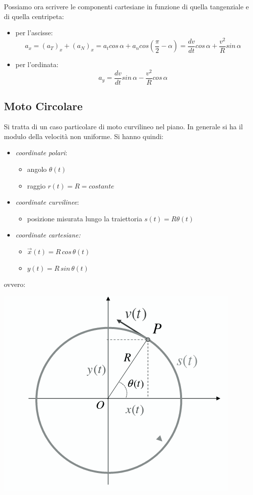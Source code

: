 \documentclass[a4paper,12pt, oneside]{book}
\begin{document}
Possiamo ora scrivere le componenti cartesiane in funzione di quella tangenziale e di quella centripeta:
\begin{itemize}
	\item per l'ascisse:
	      $$a_x=(a_T)_x+(a_N)_x=a_tcos\,\alpha+a_ncos\left(\frac{\pi}{2}-\alpha\right)=\frac{dv}{dt}cos\,\alpha+\frac{v^2}{R}sin\,\alpha$$
	\item per l'ordinata:
	      $$a_y=\frac{dv}{dt}sin\,\alpha-\frac{v^2}{R}cos\,\alpha$$
\end{itemize}
\subsection{Moto Circolare}
Si tratta di un caso particolare di moto curvilineo nel piano. In generale si ha il modulo della velocità non uniforme. Si hanno quindi:
\begin{itemize}
	\item \textit{coordinate polari}:
	      \begin{itemize}
		      \item angolo $\theta(t)$
		      \item raggio $r(t)=R=costante$
	      \end{itemize}
	\item \textit{coordinate curvilinee}:
	      \begin{itemize}
		      \item posizione misurata lungo la traiettoria $s(t)=R\theta (t)$
	      \end{itemize}
	\item \textit{coordinate cartesiane:}
	      \begin{itemize}
		      \item $\vec{x}(t)=R\,cos\,\theta(t)$
		      \item $y(t)=R\,sin\,\theta(t)$
	      \end{itemize}
\end{itemize}
ovvero:
\begin{center}
	\includegraphics[scale=0.52]{img/cir.png}
\end{center}
\end{document}
